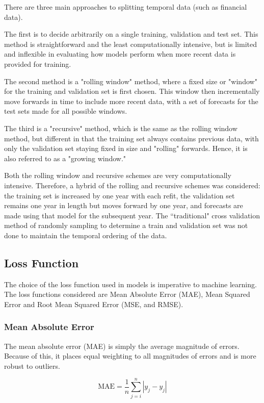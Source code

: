 \documentclass[a4paper, table]{article}
\begin{document}
There are three main approaches to splitting temporal data (such as financial data). 

The first is to decide arbitrarily on a single training, validation and test set. This method is straightforward and the least computationally intensive, but is limited and inflexible in evaluating how models perform when more recent data is provided for training. 

The second method is a "rolling window" method, where a fixed size or "window" for the training and validation set is first chosen. This window then incrementally move forwards in time to include more recent data, with a set of forecasts for the test sets made for all possible windows.

The third is a "recursive" method, which is the same as the rolling window method, but different in that the training set always contains previous data, with only the validation set staying fixed in size and "rolling" forwards. Hence, it is also referred to as a "growing window."

Both the rolling window and recursive schemes are very computationally intensive. Therefore, a hybrid of the rolling and recursive schemes was considered: the training set is increased by one year with each refit, the validation set remains one year in length but moves forward by one year, and forecasts are made using that model for the subsequent year. The ``traditional" cross validation method of randomly sampling to determine a train and validation set was not done to maintain the temporal ordering of the data.

\subsection{Loss Function}

The choice of the loss function used in models is imperative to machine learning. The loss functions considered are Mean Absolute Error (MAE), Mean Squared Error and Root Mean Squared Error (MSE, and RMSE).

\subsubsection{Mean Absolute Error}

The mean absolute error (MAE) is simply the average magnitude of errors. Because of this, it places equal weighting to all magnitudes of errors and is more robust to outliers. 

\begin{equation}
	\text{MAE} = \frac{1}{n} \sum_{j = i}^{n} |y_j - \hat{y_j}|
\end{equation}
\end{document}

